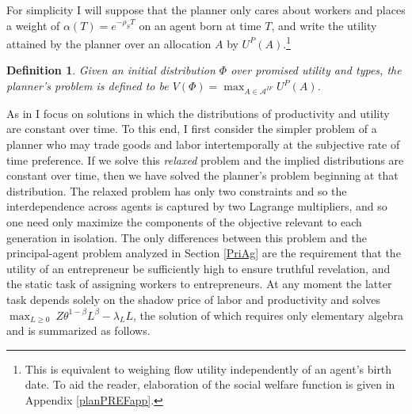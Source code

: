 \documentclass[11pt]{article}
\theoremstyle{plain}
\newtheorem{defn}{Definition}[section]
\begin{document}

For simplicity I will suppose that the planner only cares about workers and places a weight of $\alpha(T) = e^{-\rho_S T}$ on an agent born at time $T$, and write the utility attained by the planner over an allocation $A$ by $U^P(A)$.\footnote{This is equivalent to weighing flow utility independently of an agent's birth date. To aid the reader, elaboration of the social welfare function is given in Appendix \ref{planPREFapp}.} 

\begin{defn}
Given an initial distribution $\Phi$ over promised utility and types, the planner's problem is defined to be $V(\Phi) = \max_{A \in \mathcal{A}^{IF}} U^P(A)$.
\end{defn} 
As in \cite{farhi_inequality_2007} I focus on solutions in which the distributions of productivity and utility are constant over time. To this end, I first consider the simpler problem of a planner who may trade goods and labor intertemporally at the subjective rate of time preference. If we solve this \textit{relaxed} problem and the implied distributions are constant over time, then we have solved the planner's problem beginning at that distribution. The relaxed problem has only two constraints and so the interdependence across agents is captured by two Lagrange multipliers, and so one need only maximize the components of the objective relevant to each generation in isolation. The only differences between this problem and the principal-agent problem analyzed in Section \ref{PriAg} are the requirement that the utility of an entrepreneur be sufficiently high to ensure truthful revelation, and the static task of assigning workers to entrepreneurs. At any moment the latter task depends solely on the shadow price of labor and productivity and solves $\max_{L \geq 0} \ Z\theta^{1-\beta} L^{\beta} - \lambda_LL$, the solution of which requires only elementary algebra and is summarized as follows. 

\end{document}

